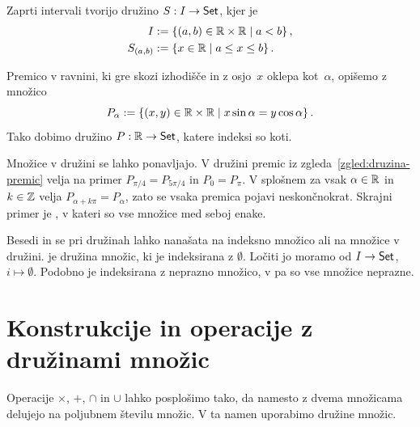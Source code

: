 \begin{zgled}
  Zaprti intervali tvorijo družino $S : I \to \mathsf{Set}$, kjer je
  \begin{align*}
    I &\mathrel{{:}{=}} \left\{(a, b) \in \mathbb{R} \times \mathbb{R} \; \middle| \; a < b\right\}, \\
    S_{(a, b)} &\mathrel{{:}{=}} \left\{x \in \mathbb{R} \; \middle| \; a \leq x \leq b\right\}.
  \end{align*}
\end{zgled}

\begin{zgled}
  \label{zgled:druzina-premic}
  Premico v ravnini, ki gre skozi izhodišče in z osjo~$x$ oklepa kot~$\alpha$, opišemo z množico
  \begin{equation*}
    P_\alpha \mathrel{{:}{=}} \left\{(x, y) \in \mathbb{R} \times \mathbb{R} \; \middle| \; x \sin \alpha = y \cos \alpha\right\}.
  \end{equation*}
  Tako dobimo družino $P : \mathbb{R} \to \mathsf{Set}$, katere indeksi so koti.
\end{zgled}

\begin{zgled}
  Množice v družini se lahko ponavljajo. V družini premic iz zgleda~\ref{zgled:druzina-premic} velja na primer $P_{\pi/4} = P_{5\pi/4}$ in $P_0 = P_\pi$. V splošnem za vsak $\alpha \in \mathbb{R}$ in $k \in \mathbb{Z}$ velja $P_{\alpha + k \pi} = P_\alpha$, zato se vsaka premica pojavi neskončnokrat. Skrajni primer je , v kateri so vse množice med seboj enake.
\end{zgled}

\begin{zgled}
  Besedi  in  se pri družinah lahko nanašata na indeksno množico ali na množice v družini.
   je družina množic, ki je indeksirana z $\emptyset$.
  Ločiti jo moramo od  $I \to \mathsf{Set}$, $i \mapsto \emptyset$.
  Podobno je  indeksirana z neprazno množico, v  pa so vse množice neprazne.
\end{zgled}


\section{Konstrukcije in operacije z družinami množic}
\label{sec:operacije-z-druzinami}

Operacije $\times$, $+$, $\cap$ in $\cup$ lahko posplošimo tako, da namesto z dvema
množicama delujejo na poljubnem številu množic. V ta namen uporabimo družine
množic.

